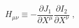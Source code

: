 \begin{equation}
H_{\mu \nu} 
\equiv 
- \frac{\partial J_1}{\partial X^\mu} 
  \frac{\partial I_2}{\partial X^\nu} \;,
\label{H}
\end{equation}

